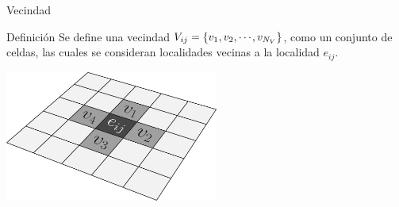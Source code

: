 \documentclass[14pt, aspectratio = 1610, xcolor=table, structureblod]{beamer}
\begin{document}
\begin{frame}{Vecindad}
	\vspace{-6pt}%
	\begin{block}{Definición}
		Se define una vecindad $V_{ij} = \{v_1, v_2, \cdots\hspace{-1pt}, v_{N_V}\}$, como un conjunto de celdas, las cuales se consideran localidades vecinas a la localidad $e_{ij}$.
	\end{block}
	\vfill
	\centering
	\includegraphics[width=7cm]{vecindad}
\end{frame}
\end{document}
